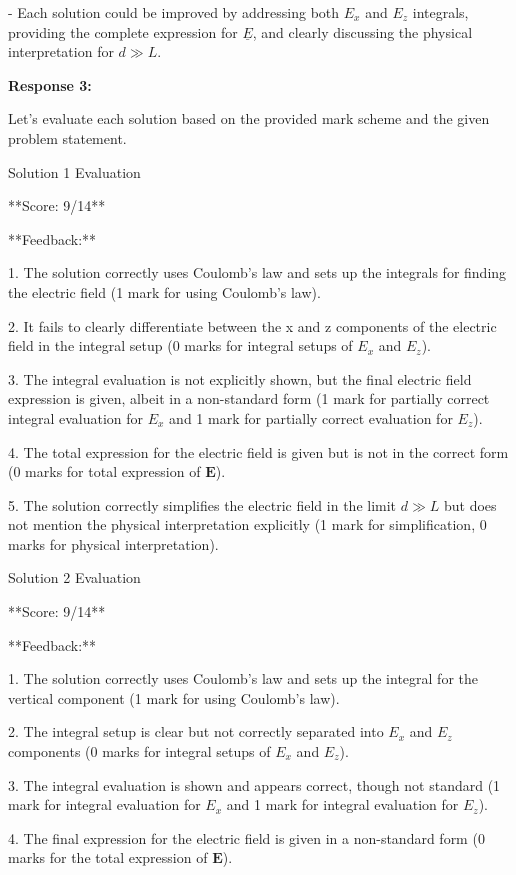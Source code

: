 \documentclass[a4paper,11pt]{article}
\begin{document}
- Each solution could be improved by addressing both \( E_x \) and \( E_z \) integrals, providing the complete expression for \( \underline{E} \), and clearly discussing the physical interpretation for \( d \gg L \).

\bigskip
\textbf{Response 3:}

Let's evaluate each solution based on the provided mark scheme and the given problem statement.

Solution 1 Evaluation

**Score: 9/14**

**Feedback:**

1. The solution correctly uses Coulomb's law and sets up the integrals for finding the electric field (1 mark for using Coulomb's law).

2. It fails to clearly differentiate between the x and z components of the electric field in the integral setup (0 marks for integral setups of \( E_x \) and \( E_z \)).

3. The integral evaluation is not explicitly shown, but the final electric field expression is given, albeit in a non-standard form (1 mark for partially correct integral evaluation for \( E_x \) and 1 mark for partially correct evaluation for \( E_z \)).

4. The total expression for the electric field is given but is not in the correct form (0 marks for total expression of \(\mathbf{E}\)).

5. The solution correctly simplifies the electric field in the limit \( d \gg L \) but does not mention the physical interpretation explicitly (1 mark for simplification, 0 marks for physical interpretation).

Solution 2 Evaluation

**Score: 9/14**

**Feedback:**

1. The solution correctly uses Coulomb's law and sets up the integral for the vertical component (1 mark for using Coulomb's law).

2. The integral setup is clear but not correctly separated into \( E_x \) and \( E_z \) components (0 marks for integral setups of \( E_x \) and \( E_z \)).

3. The integral evaluation is shown and appears correct, though not standard (1 mark for integral evaluation for \( E_x \) and 1 mark for integral evaluation for \( E_z \)).

4. The final expression for the electric field is given in a non-standard form (0 marks for the total expression of \(\mathbf{E}\)).
\end{document}
